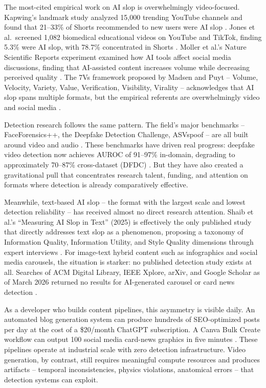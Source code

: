 \documentclass[12pt]{article}
\begin{document}
The most-cited empirical work on AI slop is overwhelmingly video-focused. Kapwing's landmark study analyzed 15,000 trending YouTube channels and found that 21--33\% of Shorts recommended to new users were AI slop \cite{kapwing2025}. Jones et al.\ screened 1,082 biomedical educational videos on YouTube and TikTok, finding 5.3\% were AI slop, with 78.7\% concentrated in Shorts \cite{jones2025}. Moller et al.'s Nature Scientific Reports experiment examined how AI tools affect social media discussions, finding that AI-assisted content increases volume while decreasing perceived quality \cite{moller2026}. The 7Vs framework proposed by Madsen and Puyt -- Volume, Velocity, Variety, Value, Verification, Visibility, Virality -- acknowledges that AI slop spans multiple formats, but the empirical referents are overwhelmingly video and social media \cite{madsen2026}.

Detection research follows the same pattern. The field's major benchmarks -- FaceForensics++, the Deepfake Detection Challenge, ASVspoof -- are all built around video and audio \cite{deepfake2020}. These benchmarks have driven real progress: deepfake video detection now achieves AUROC of 91--97\% in-domain, degrading to approximately 70--87\% cross-dataset (DFDC) \cite{deepfake2020}. But they have also created a gravitational pull that concentrates research talent, funding, and attention on formats where detection is already comparatively effective.

Meanwhile, text-based AI slop -- the format with the largest scale and lowest detection reliability -- has received almost no direct research attention. Shaib et al.'s ``Measuring AI Slop in Text'' (2025) is effectively the only published study that directly addresses text slop as a phenomenon, proposing a taxonomy of Information Quality, Information Utility, and Style Quality dimensions through expert interviews \cite{shaib2025}. For image-text hybrid content such as infographics and social media carousels, the situation is starker: no published detection study exists at all. Searches of ACM Digital Library, IEEE Xplore, arXiv, and Google Scholar as of March 2026 returned no results for AI-generated carousel or card news detection \cite{nostudy2026}.

As a developer who builds content pipelines, this asymmetry is visible daily. An automated blog generation system can produce hundreds of SEO-optimized posts per day at the cost of a \$20/month ChatGPT subscription. A Canva Bulk Create workflow can output 100 social media card-news graphics in five minutes \cite{jackreview2026}. These pipelines operate at industrial scale with zero detection infrastructure. Video generation, by contrast, still requires meaningful compute resources and produces artifacts -- temporal inconsistencies, physics violations, anatomical errors -- that detection systems can exploit.
\end{document}
